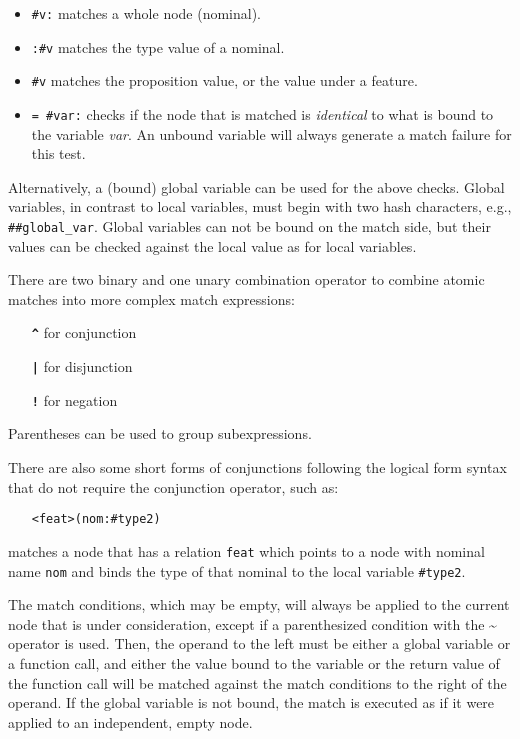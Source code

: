\documentclass[11pt,a4paper]{article}
\newcommand{\cd}[1]{\texttt{#1}}
\begin{document}
\begin{itemize}
\item \cd{\#v:} matches a whole node (nominal).
\item \cd{:\#v} matches the type value of a nominal.
\item \cd{\#v} matches the proposition value, or the value under a feature.
\item \cd{= \#var:} checks if the node that is matched is \emph{identical} to
  what is bound to the variable \emph{var}. An unbound variable will always
  generate a match failure for this test.
\end{itemize}

Alternatively, a (bound) global variable can be used for the above checks.
Global variables, in contrast to local variables, must begin with two hash
characters, e.g., \texttt{\#\#global\_var}. Global variables can not be bound
on the match side, but their values can be checked against the local value as
for local variables.

There are two binary and one unary combination operator to combine atomic
matches into more complex match expressions:

\begin{itemize}\addtolength{\itemsep}{-.5\itemsep}
\item[\textbf{\cd{\^}}] for conjunction
\item[\textbf{\cd{|}}] for disjunction
\item[\textbf{\cd{!}}] for negation
\end{itemize}

Parentheses can be used to group subexpressions.

There are also some short forms of conjunctions following the logical form
syntax that do not require the conjunction operator, such as:

\begin{itemize}
\item[] \cd{<feat>(nom:\#type2)}
\end{itemize}
matches a node that has a relation \cd{feat} which points to a node with
nominal name \cd{nom} and binds the type of that nominal to the local variable
\cd{\#type2}.

The match conditions, which may be empty, will always be applied to the current
node that is under consideration, except if a parenthesized condition with the
\textbf{\~} operator is used. Then, the operand to the left must be either a
global variable or a function call, and either the value bound to the variable
or the return value of the function call will be matched against the match
conditions to the right of the operand. If the global variable is not bound,
the match is executed as if it were applied to an independent, empty node.
\end{document}

